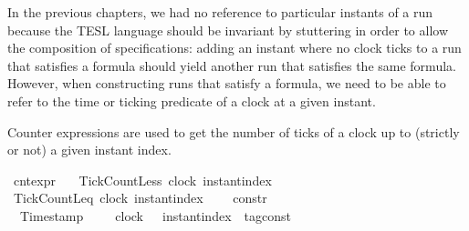 \begin{isabellebody}
\begin{isamarkuptext}
  In the previous chapters, we had no reference to particular instants of a run 
  because the TESL language should be invariant by stuttering in order to allow 
  the composition of specifications: adding an instant where no clock ticks to 
  a run that satisfies a formula should yield another run that satisfies the 
  same formula. However, when constructing runs that satisfy a formula, we
  need to be able to refer to the time or ticking predicate of a clock at a given
  instant.%
\end{isamarkuptext}\isamarkuptrue%
%
\begin{isamarkuptext}%
Counter expressions are used to get the number of ticks of a clock up to 
  (strictly or not) a given instant index.%
\end{isamarkuptext}\isamarkuptrue%
\isamarkupfalse%
\ cnt{\isacharunderscore}expr\ {\isacharequal}\isanewline
\ \ TickCountLess\ {\isacartoucheopen}clock{\isacartoucheclose}\ {\isacartoucheopen}instant{\isacharunderscore}index{\isacartoucheclose}\ {\isacharparenleft}{\isacartoucheopen}{\isacharhash}\isactrlsup {\isacharless}{\isacartoucheclose}{\isacharparenright}\isanewline
{\isacharbar}\ TickCountLeq\ {\isacartoucheopen}clock{\isacartoucheclose}\ {\isacartoucheopen}instant{\isacharunderscore}index{\isacartoucheclose}\ \ {\isacharparenleft}{\isacartoucheopen}{\isacharhash}\isactrlsup {\isasymle}{\isacartoucheclose}{\isacharparenright}%
\isadelimdocument
%
\endisadelimdocument
%
\isatagdocument
%
\isamarkuptrue%
%
\endisatagdocument
{\isafolddocument}%
%
\isadelimdocument
%
\endisadelimdocument
{}\isamarkupfalse%
\ {\isacharprime}{\isasymtau}\ constr\ {\isacharequal}\isanewline
%
\isanewline
\ \ Timestamp\ \ \ \ \ {\isacartoucheopen}clock{\isacartoucheclose}\ \ \ {\isacartoucheopen}instant{\isacharunderscore}index{\isacartoucheclose}\ {\isacartoucheopen}{\isacharprime}{\isasymtau}\ tag{\isacharunderscore}const{\isacartoucheclose}\ \ \ \ \ \ \ \ \ {\isacharparenleft}{\isacartoucheopen}{\isacharunderscore}\ {\isasymDown}\ {\isacharunderscore}\ {\isacharat}\ {\isacharunderscore}{\isacartoucheclose}{\isacharparenright}\isanewline
\isanewline
%
\end{isabellebody}
